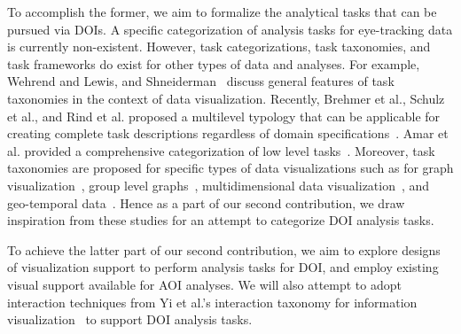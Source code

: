 To accomplish the former, we aim to formalize the analytical tasks that can be pursued via DOIs. A specific categorization of analysis tasks for eye-tracking data is currently non-existent. However, task categorizations, task taxonomies, and task frameworks do exist for other types of data and analyses. For example, Wehrend and Lewis, and Shneiderman~\cite{Weh90, Shne96} discuss general features of task taxonomies in the context of data visualization. Recently, Brehmer et al., Schulz et al., and Rind et al. proposed a multilevel typology that can be applicable for creating complete task descriptions regardless of domain specifications~\cite{Bre13, Sch13, Rind15}.  Amar et al. provided a comprehensive categorization of low level tasks~\cite{Ama05}.  Moreover, task taxonomies are proposed for specific types of data visualizations such as for graph visualization~\cite{Lee06}, group level graphs~\cite{Sak14}, multidimensional data visualization~\cite{Ward02}, and geo-temporal data~\cite{And03, Roth13}. Hence as a part of our second contribution, we draw inspiration from these studies for an attempt to categorize DOI analysis tasks. 

To achieve the latter part of our second contribution, we aim to explore designs of visualization support to perform analysis tasks for DOI, and employ existing visual support available for AOI analyses. We will also attempt to adopt interaction techniques from Yi et al.'s interaction taxonomy for information visualization~\cite{Yi07} to support DOI analysis tasks. 